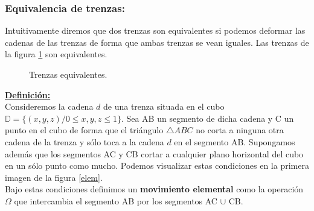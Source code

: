 \documentclass[14pt]{extarticle}
\begin{document}
\bigskip
\begin{center}
	\subsubsection{Equivalencia de trenzas:}
\end{center}
Intuitivamente diremos que dos trenzas son equivalentes si podemos deformar las cadenas de las trenzas de forma que ambas trenzas se vean iguales. Las trenzas de la figura \ref{tren3} son equivalentes.\\
\begin{figure}[h!]
	\centering
	\space
	\caption{Trenzas equivalentes.}
	\label{tren3} 
\end{figure}

\textbf{\underline{Definición:}}\\
Consideremos la cadena $d$ de una trenza situada en el cubo $\mathds{D} = \{(x,y,z) / 0 \leq x,y,z \leq 1\}$. Sea AB un segmento de dicha cadena y C un punto en el cubo de forma que el triángulo $\triangle ABC$ no corta a ninguna otra cadena de la trenza y sólo toca a la cadena $d$ en el segmento AB. Supongamos además que los segmentos AC y CB cortar a cualquier plano horizontal del cubo en un sólo punto como mucho. Podemos visualizar estas condiciones en la primera imagen de la figura \ref{elem}.\\
Bajo estas condiciones definimos un \textbf{movimiento elemental} como la operación $ \Omega $ que intercambia el segmento AB por los segmentos AC $ \cup $ CB.\\
\end{document}
